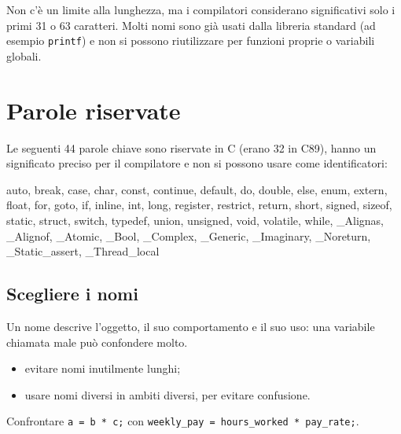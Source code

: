 \documentclass[11pt,a4paper]{article}
\begin{document}
Non c'è un limite alla lunghezza, ma i compilatori considerano significativi
solo i primi 31 o 63 caratteri. Molti nomi sono già usati dalla libreria
standard (ad esempio \lstinline|printf|) e non si possono riutilizzare per
funzioni proprie o variabili globali.

\section{Parole riservate}

Le seguenti 44 parole chiave sono riservate in C (erano 32 in C89), hanno un
significato preciso per il compilatore e non si possono usare come
identificatori:

\begin{center}
\begin{minipage}{0.9\textwidth}
\ttfamily\small
auto, break, case, char, const, continue, default, do, double, else, enum,
extern, float, for, goto, if, inline, int, long, register, restrict, return,
short, signed, sizeof, static, struct, switch, typedef, union, unsigned, void,
volatile, while, \_Alignas, \_Alignof, \_Atomic, \_Bool, \_Complex, \_Generic,
\_Imaginary, \_Noreturn, \_Static\_assert, \_Thread\_local
\end{minipage}
\end{center}

\subsection{Scegliere i nomi}

Un nome descrive l'oggetto, il suo comportamento e il suo uso: una variabile
chiamata male può confondere molto.
\begin{itemize}
    \item evitare nomi inutilmente lunghi;
    \item usare nomi diversi in ambiti diversi, per evitare confusione.
\end{itemize}

\begin{esempio}
Confrontare \lstinline|a = b * c;| con
\lstinline|weekly_pay = hours_worked * pay_rate;|.
\end{esempio}
\end{document}
